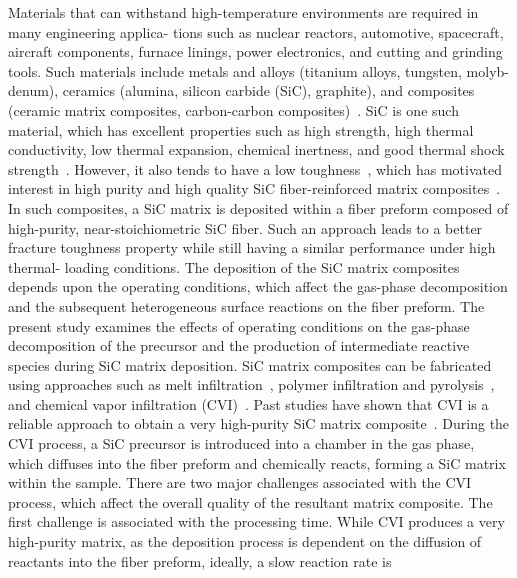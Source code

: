 \documentclass[final, letterpaper, square, comma, numbers, sort&compress]{elsarticle}
\begin{document}
Materials that can withstand high-temperature environments are required in many engineering applica-
tions such as nuclear reactors, automotive, spacecraft, aircraft components, furnace linings, power electronics,
and cutting and grinding tools. Such materials include metals and alloys (titanium alloys, tungsten, molyb-
denum), ceramics (alumina, silicon carbide (SiC), graphite), and composites (ceramic matrix composites,
carbon-carbon composites)~\cite{Meetham1991,Tressler1999,Belmonte2006,Fahrenholtz2014,BarCohen2014}. SiC is one such material, which has excellent properties such as high
strength, high thermal conductivity, low thermal expansion, chemical inertness, and good thermal shock
strength~\cite{Levinshtein2001,Hironaka2002,Snead2007,Presser2008}. However, it also tends to have a low toughness~\cite{Padture1994,Mulla1994,Cao1995}, which has motivated interest in high
purity and high quality SiC fiber-reinforced matrix composites~\cite{Naslain1995,Prewo1989,Besmann1991,Wang1996,Prouhet1994,Zhu1999,Liu2023}. In such composites, a SiC matrix is deposited within a fiber preform composed of high-purity, near-stoichiometric SiC fiber. Such an approach
leads to a better fracture toughness property while still having a similar performance under high thermal-
loading conditions. The deposition of the SiC matrix composites depends upon the operating conditions,
which affect the gas-phase decomposition and the subsequent heterogeneous surface reactions on the fiber
preform. The present study examines the effects of operating conditions on the gas-phase decomposition of
the precursor and the production of intermediate reactive species during SiC matrix deposition.
SiC matrix composites can be fabricated using approaches such as melt infiltration~\cite{Xu1999,DiCarlo2005}, polymer
infiltration and pyrolysis~\cite{Sirieix1990, Kohyama2000}, and chemical vapor infiltration (CVI)~\cite{Sayano1999,Lamon2005,Deck2013}. Past studies have shown
that CVI is a reliable approach to obtain a very high-purity SiC matrix composite~\cite{Lamon2005,Katoh2014}. During the CVI
process, a SiC precursor is introduced into a chamber in the gas phase, which diffuses into the fiber preform
and chemically reacts, forming a SiC matrix within the sample. There are two major challenges associated
with the CVI process, which affect the overall quality of the resultant matrix composite. The first challenge
is associated with the processing time. While CVI produces a very high-purity matrix, as the deposition
process is dependent on the diffusion of reactants into the fiber preform, ideally, a slow reaction rate is
\end{document}
